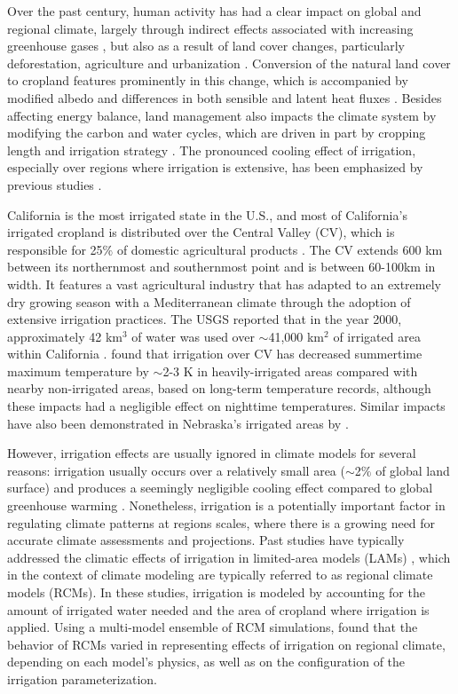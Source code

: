 Over the past century, human activity has had a clear impact on global and regional climate, largely through indirect effects associated with increasing greenhouse gases \cite{solomon2007ipcc}, but also as a result of land cover changes, particularly deforestation, agriculture and urbanization \cite{bonan1997effects, pielke2002influence, kueppers2008seasonal}. Conversion of the natural land cover to cropland features prominently in this change, which is accompanied by modified albedo and differences in both sensible and latent heat fluxes \cite{foley2003green}. Besides affecting energy balance, land management also impacts the climate system by modifying the carbon and water cycles, which are driven in part by cropping length and irrigation strategy \cite{lobell2006biogeophysical}. The pronounced cooling effect of irrigation, especially over regions where irrigation is extensive, has been emphasized by previous studies \cite{kueppers2007irrigation, lobell2008effect}.

California is the most irrigated state in the U.S., and most of California's irrigated cropland is distributed over the Central Valley (CV), which is responsible for 25$\%$ of domestic agricultural products \cite{wilkinson2002potential}. The CV extends 600 km between its northernmost and southernmost point and is between 60-100km in width.  It features a vast agricultural industry that has adapted to an extremely dry growing season with a Mediterranean climate through the adoption of extensive irrigation practices. The USGS reported that in the year 2000, approximately 42 km$^3$ of water was used over $\sim$41,000 km$^2$ of irrigated area within California \cite{doll2002global, famiglietti2011satellites}. \cite{bonfils2007empirical} found that irrigation over CV has decreased summertime maximum temperature by $\sim$2-3 K in heavily-irrigated areas compared with nearby non-irrigated areas, based on long-term temperature records, although these impacts had a negligible effect on nighttime temperatures. Similar impacts have also been demonstrated in Nebraska's irrigated areas by \cite{mahmood2006impacts}.

However, irrigation effects are usually ignored in climate models for several reasons: irrigation usually occurs over a relatively small area ($\sim$2$\%$ of global land surface) and produces a seemingly negligible cooling effect compared to global greenhouse warming \cite{boucher2004direct}. Nonetheless, irrigation is a potentially important factor in regulating climate patterns at regions scales, where there is a growing need for accurate climate assessments and projections. Past studies have typically addressed the climatic effects of irrigation in limited-area models (LAMs) \cite{snyder2006regional, kueppers2007irrigation}, which in the context of climate modeling are typically referred to as regional climate models (RCMs). In these studies, irrigation is modeled by accounting for the amount of irrigated water needed and the area of cropland where irrigation is applied. Using a multi-model ensemble of RCM simulations, \cite{kueppers2008seasonal} found that the behavior of RCMs varied in representing effects of irrigation on regional climate, depending on each model's physics, as well as on the configuration of the irrigation parameterization.

